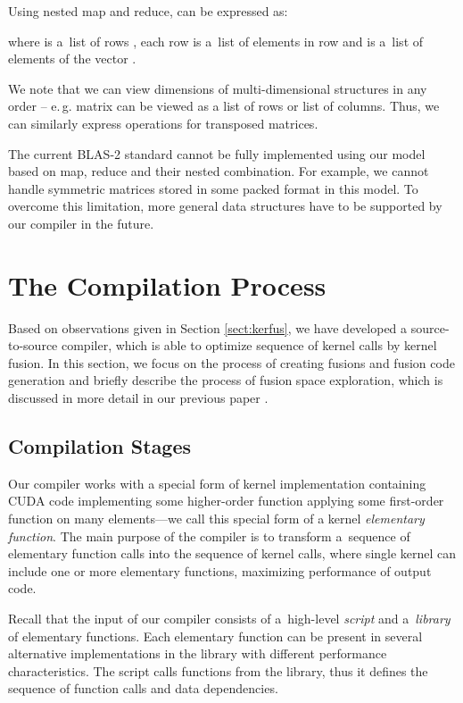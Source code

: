 \documentclass[final]{siamltex}
\def\eg{e.\,g.}
\begin{document}
{Using nested map and reduce,  can be expressed as:

where  is a~list of rows , each row  is a~list of elements in  row and  is a~list of elements of the vector .

We note that we can view dimensions of multi-dimensional structures in any order -- \eg{} matrix can be viewed as a list of rows or list of columns. Thus, we can similarly express operations for transposed matrices.

The current BLAS-2 standard cannot be fully implemented using our model based on map, reduce and their nested combination. For example, we cannot handle symmetric matrices stored in some packed format in this model. To overcome this limitation, more general data structures have to be supported by our compiler in the future.


\section{The Compilation Process}
\label{sect:compilation}

Based on observations given in Section \ref{sect:kerfus}, we have developed a source-to-source compiler, which is able to optimize sequence of kernel calls by kernel fusion. In this section, we focus on the process of creating fusions and fusion code generation and briefly describe the process of fusion space exploration, which is discussed in more detail in our previous paper \cite{fousek2011automatic}.

\subsection{Compilation Stages}

Our compiler works with a special form of kernel implementation containing CUDA code implementing some higher-order function applying some first-order function on many elements---we call this special form of a kernel \textit{elementary function}. The main purpose of the compiler is to transform a~sequence of elementary function calls into the sequence of kernel calls, where single kernel can include one or more elementary functions, maximizing performance of output code. 

Recall that the input of our compiler consists of a~high-level \textit{script} and a~\textit{library} of elementary functions. Each elementary function can be present in several alternative implementations in the library with different performance characteristics. The script calls functions from the library, thus it defines the sequence of function calls and data dependencies.

}
\end{document}
